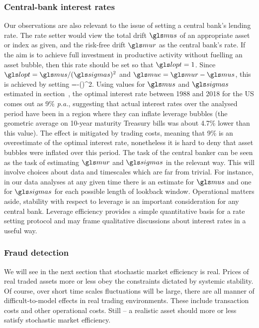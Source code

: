 \subsubsection{Central-bank interest rates}
Our observations are also relevant to the issue of setting a central bank's lending rate. The rate setter would view the total drift $\mus$ of an appropriate asset or index as given, and the risk-free drift $\mur$ as the central bank's rate. If the aim is to achieve full investment in productive activity without fuelling an asset bubble, then this rate should be set so that $\lopt=1$. Since $\lopt=\mus/(\sigmas)^2$ and $\mue=\mur-\mus$, this is achieved by setting 
\be
\mur=\mus-(\sigmas)^2.
\ee
Using values for $\mus$ and $\sigmas$ estimated in section~, the optimal interest rate between 1988 and 2018 for the US comes out as 9\% {\it p.a.}, suggesting that actual interest rates over the analysed period have been in a region where they can inflate leverage bubbles (the geometric average on 10-year maturity Treasury bills was about 4.7\% \pa lower than this value). The effect is mitigated by trading costs, meaning that 9\% is an overestimate of the optimal interest rate, nonetheless it is hard to deny that asset bubbles were inflated over this period. The task of the central banker can be seen as the task of estimating $\mur$ and $\sigmas$ in the relevant way. This will involve choices about data and timescales which are far from trivial. For instance, in our data analyses at any given time there is an estimate for $\mus$ and one for $\sigmas$ for each possible length of lookback window. Operational matters aside, stability with respect to leverage is an important consideration for any central bank. Leverage efficiency provides a simple quantitative basis for a rate setting protocol and may frame qualitative discussions about interest rates in a useful way.


\subsubsection{Fraud detection}
We will see in the next section that stochastic market efficiency is real. Prices of real traded assets more or less obey the constraints dictated by systemic stability. Of course, over short time scales fluctuations will be large, there are all manner of difficult-to-model effects in real trading environments. These include transaction costs and other operational costs. Still -- a realistic asset should more or less satisfy stochastic market efficiency.

